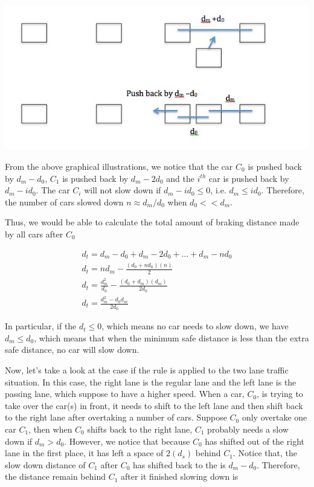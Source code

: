 \begin{center}
\includegraphics[scale = 0.5]{plot/P2}
\end{center}

From the above graphical illustrations, we notice that the car $C_0$ is pushed back by $d_m-d_0$, $C_1$ is pushed back by $d_m-2d_0$ and the $i^{th}$ car is pushed back by $d_m-id_0$. The car $C_i$ will not slow down if $d_m-id_0\le 0$, i.e. $d_m \le id_0$. Therefore, the number of cars slowed down $n \approx d_m/d_0$ when $d_0 << d_m$. 

Thus, we would be able to calculate the total amount of braking distance made by all cars after $C_0$

\begin{align}
&d_t = d_m-d_0 + d_m-2d_0 + \dots + d_m - nd_0 & \\
&d_t = nd_m-\frac{(d_0+nd_0)(n)}{2}&\\
&d_t = \frac{d_m^2}{d_0}-\frac{(d_0+d_m)(d_m)}{2d_0}&\\
&d_t = \frac{d_m^2-d_0d_m}{2d_0}
\end{align}

In particular, if the $d_t \le 0$, which means no car needs to slow down, we have $d_m\le d_0$, which means that when the minimum safe distance is less than the extra safe distance, no car will slow down. 

Now, let's take a look at the case if the rule is applied to the two lane traffic situation. In this case, the right lane is the regular lane and the left lane is the passing lane, which suppose to have a higher speed. When a car, $C_0$, is trying to take over the car(s) in front, it needs to shift to the left lane and then shift back to the right lane after overtaking a number of cars. Suppose $C_0$ only overtake one car $C_1$, then when $C_0$ shifts back to the right lane, $C_1$ probably needs a slow down if $d_m>d_0$. However, we notice that because $C_0$ has shifted out of the right lane in the first place, it has left a space of $2(d_s)$ behind $C_1$. Notice that, the slow down distance of $C_1$ after $C_0$ has shifted back to the is $d_m-d_0$. Therefore, the distance remain behind $C_1$ after it finished slowing down is

